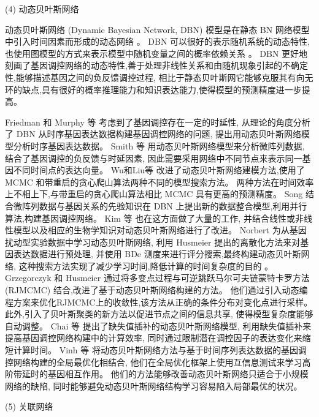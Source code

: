 (4) 动态贝叶斯网络

动态贝叶斯网络 (Dynamic Bayesian Network, DBN) 模型是在静态 BN 网络模型中引入时间因素而形成的动态网络 \cite{dondelinger2010heterogeneous,grzegorczyk2010improvements}。
DBN 可以很好的表示随机系统的动态特性,也使用图模型的方式来表示模型中随机变量之间的概率依赖关系 \cite{hecker2009gene}。
DBN 更好地刻画了基因调控网络的动态特性,善于处理非线性关系和由随机现象引起的不确定性,能够描述基因之间的负反馈调控过程,
相比于静态贝叶斯网它能够克服其有向无环的缺点,具有很好的概率推理能力和知识表达能力,使得模型的预测精度进一步提高。

Friedman 和 Murphy 等 \cite{friedman2004inferring} 考虑到了基因调控存在一定的时延性,
从理论的角度分析了 DBN 从时序基因表达数据构建基因调控网络的问题, 提出用动态贝叶斯网络模型分析时序基因表达数据。
Smith 等 \cite{smith2006computational} 用动态贝叶斯网络模型来分析微阵列数据,
结合了基因调控的负反馈与时延因素, 因此需要采用网络中不同节点来表示同一基因不同时间点的表达向量。
Wu和Liu等 \cite{wu2008dynamic} 改进了动态贝叶斯网络建模方法,使用了 MCMC 和带重启的贪心爬山算法两种不同的模型搜索方法。 
两种方法在时间效率上不相上下,与带重启的贪心爬山算法相比 MCMC 具有更高的预测精度。
Song \cite{song2009keller}结合微阵列数据与基因关系的先验知识在 DBN 上提出新的数据整合模型,利用并行算法,构建基因调控网络。
Kim 等 \cite{del2010efficient} 也在这方面做了大量的工作,
并结合线性或非线性模型以及相应的生物学知识对动态贝叶斯网络进行了改进。
Norbert \cite{netrapalli2010greedy} 为从基因扰动型实验数据中学习动态贝叶斯网络,
利用 Husmeier \cite{werhli2006comparative} 提出的离散化方法来对基因表达数据进行预处理,
并使用 BDe 测度来进行评分搜索,最终构建动态贝叶斯网络, 这种搜索方法实现了减少学习时间,降低计算的时间复杂度的目的 \cite{hurley2011gene}。
Grzegorczyk 和 Husmeier \cite{grzegorczyk2010improvements} 通过将多变点过程与可逆跳跃马尔可夫链蒙特卡罗方法 (RJMCMC) 结合,改进了基于动态贝叶斯网络构建的方法。 他们通过引入动态编程方案来优化RJMCMC上的收敛性,该方法从正确的条件分布对变化点进行采样。 
此外,引入了贝叶斯聚类的新方法以促进节点之间的信息共享, 使得模型复杂度能够自动调整。
Chai 等 \cite{chai2012inferring} 提出了缺失值插补的动态贝叶斯网络模型,
利用缺失值插补来提高基因调控网络构建中的计算效率,
同时通过限制潜在调控因子的表达变化来缩短计算时间。
Vinh 等 \cite{vinh2012gene} 将动态贝叶斯网络方法与基于时间序列表达数据的基因调控网络构建的全局最优化相结合,
他们在全局优化框架上使用互信息测试来学习高阶带延时的基因相互作用。
他们的方法能够改善动态贝叶斯网络只适合于小规模网络的缺陷,
同时能够避免动态贝叶斯网络结构学习容易陷入局部最优的状况。

(5) 关联网络

